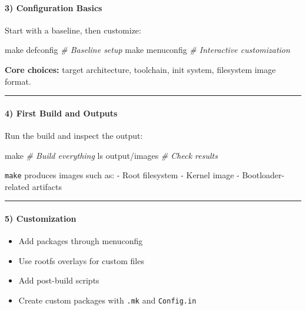 \documentclass[
  english,
  paper=a4,
  oneside  ,captions=tableheading
]{scrartcl}
\newenvironment{Shaded}{}{}
\newcommand{\CommentTok}[1]{\textcolor[rgb]{0.38,0.63,0.69}{\textit{#1}}}
\newcommand{\FunctionTok}[1]{\textcolor[rgb]{0.02,0.16,0.49}{#1}}
\newcommand{\NormalTok}[1]{#1}
\providecommand{\tightlist}{%
  \setlength{\itemsep}{0pt}\setlength{\parskip}{0pt}}
\begin{document}
\paragraph{3) Configuration Basics}\label{configuration-basics}

Start with a baseline, then customize:

\begin{Shaded}
\begin{Highlighting}[]
\FunctionTok{make}\NormalTok{ defconfig          }\CommentTok{\# Baseline setup}
\FunctionTok{make}\NormalTok{ menuconfig         }\CommentTok{\# Interactive customization}
\end{Highlighting}
\end{Shaded}

\textbf{Core choices:} target architecture, toolchain, init system,
filesystem image format.

\begin{center}\rule{0.5\linewidth}{0.5pt}\end{center}

\paragraph{4) First Build and Outputs}\label{first-build-and-outputs}

Run the build and inspect the output:

\begin{Shaded}
\begin{Highlighting}[]
\FunctionTok{make}                    \CommentTok{\# Build everything}
\FunctionTok{ls}\NormalTok{ output/images        }\CommentTok{\# Check results}
\end{Highlighting}
\end{Shaded}

\texttt{make} produces images such as: - Root filesystem - Kernel image
- Bootloader-related artifacts

\begin{center}\rule{0.5\linewidth}{0.5pt}\end{center}

\paragraph{5) Customization}\label{customization}

\begin{itemize}
\tightlist
\item
  Add packages through menuconfig
\item
  Use rootfs overlays for custom files
\item
  Add post-build scripts
\item
  Create custom packages with \texttt{.mk} and \texttt{Config.in}
\end{itemize}
\end{document}
